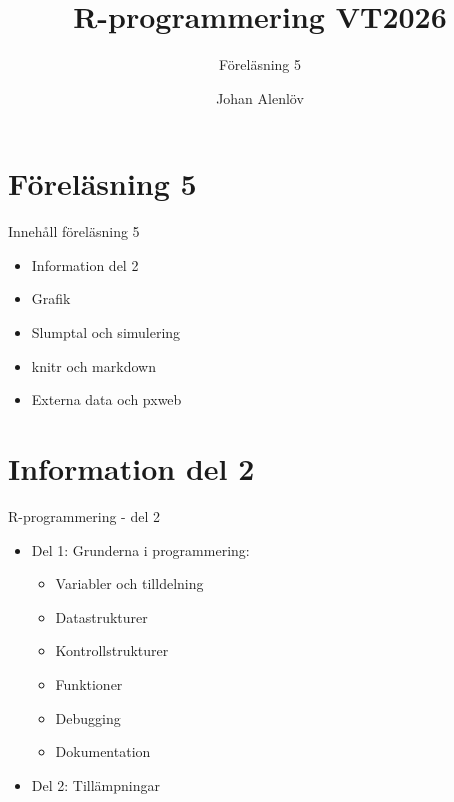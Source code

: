 \documentclass[
  11pt,
  ignorenonframetext,
  handout]{beamer}
\title{\texorpdfstring{R-programmering VT2026}{R-programmering VT2026}}
\subtitle{\texorpdfstring{Föreläsning 5}{Föreläsning 5}}
\author{\texorpdfstring{Johan Alenlöv}{Johan Alenlöv}}
\date{}
\institute{Linköpings Universitet}
\providecommand{\tightlist}{%
  \setlength{\itemsep}{0pt}\setlength{\parskip}{0pt}}
\begin{document}
\frame{\titlepage}

\section{Föreläsning 5}\label{fuxf6reluxe4sning-5}

\begin{frame}{Innehåll föreläsning 5}
\protect{}\label{innehuxe5ll-fuxf6reluxe4sning-5}
\begin{itemize}
\tightlist
\item
  Information del 2
\item
  Grafik
\item
  Slumptal och simulering
\item
  knitr och markdown
\item
  Externa data och pxweb
\end{itemize}
\end{frame}

\section{Information del 2}\label{information-del-2}

\begin{frame}{R-programmering - del 2}
\protect{}\label{r-programmering---del-2}
\begin{itemize}
\tightlist
\item
  Del 1: Grunderna i programmering:

  \begin{itemize}
  \tightlist
  \item
    Variabler och tilldelning
  \item
    Datastrukturer
  \item
    Kontrollstrukturer
  \item
    Funktioner
  \item
    Debugging
  \item
    Dokumentation
  \end{itemize}
\item
  Del 2: Tillämpningar
\end{itemize}
\end{frame}
\end{document}

